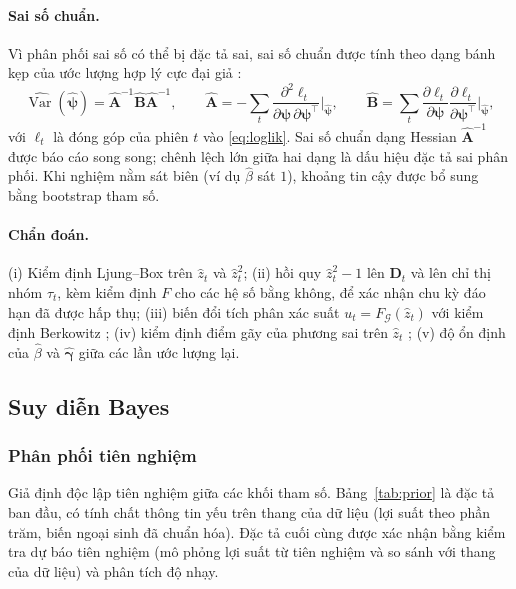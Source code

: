 \documentclass[12pt,a4paper]{article}
\theoremstyle{definition}
\theoremstyle{remark}
\newcommand{\Gcal}{\mathcal{G}}
\newcommand{\bpsi}{\boldsymbol{\psi}}
\newcommand{\bgamma}{\boldsymbol{\gamma}}
\newcommand{\bD}{\mathbf{D}}
\begin{document}
\paragraph{Sai số chuẩn.} Vì phân phối sai số có thể bị đặc tả sai, sai số chuẩn được tính theo dạng bánh kẹp của ước lượng hợp lý cực đại giả \cite{bollerslevwooldridge1992}:
\begin{equation}
\widehat{\operatorname{Var}}(\hat{\bpsi})=\hat{\mathbf A}^{-1}\hat{\mathbf B}\hat{\mathbf A}^{-1},\qquad
\hat{\mathbf A}=-\sum_{t}\frac{\partial^2\ell_t}{\partial\bpsi\,\partial\bpsi^\top}\Big|_{\hat{\bpsi}},\qquad
\hat{\mathbf B}=\sum_{t}\frac{\partial\ell_t}{\partial\bpsi}\frac{\partial\ell_t}{\partial\bpsi^\top}\Big|_{\hat{\bpsi}},
\end{equation}
với $\ell_t$ là đóng góp của phiên $t$ vào \eqref{eq:loglik}. Sai số chuẩn dạng Hessian $\hat{\mathbf A}^{-1}$ được báo cáo song song; chênh lệch lớn giữa hai dạng là dấu hiệu đặc tả sai phân phối. Khi nghiệm nằm sát biên (ví dụ $\hat\beta$ sát $1$), khoảng tin cậy được bổ sung bằng bootstrap tham số.

\paragraph{Chẩn đoán.} (i) Kiểm định Ljung--Box trên $\hat z_t$ và $\hat z_t^2$; (ii) hồi quy $\hat z_t^2-1$ lên $\bD_t$ và lên chỉ thị nhóm $\tau_t$, kèm kiểm định $F$ cho các hệ số bằng không, để xác nhận chu kỳ đáo hạn đã được hấp thụ; (iii) biến đổi tích phân xác suất $u_t=F_{\Gcal}(\hat z_t)$ với kiểm định Berkowitz \cite{berkowitz2001}; (iv) kiểm định điểm gãy của phương sai trên $\hat z_t$ \cite{inclan1994}; (v) độ ổn định của $\hat\beta$ và $\hat{\bgamma}$ giữa các lần ước lượng lại.

\subsection{Suy diễn Bayes}

\subsubsection{Phân phối tiên nghiệm}

Giả định độc lập tiên nghiệm giữa các khối tham số. Bảng~\ref{tab:prior} là đặc tả ban đầu, có tính chất thông tin yếu trên thang của dữ liệu (lợi suất theo phần trăm, biến ngoại sinh đã chuẩn hóa). Đặc tả cuối cùng được xác nhận bằng kiểm tra dự báo tiên nghiệm (mô phỏng lợi suất từ tiên nghiệm và so sánh với thang của dữ liệu) và phân tích độ nhạy.
\end{document}
